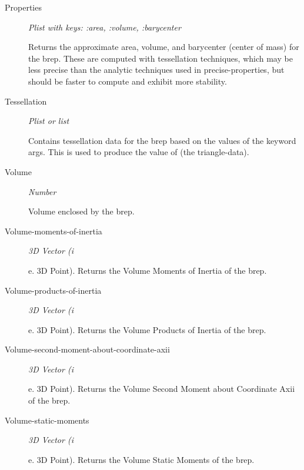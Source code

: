 \documentclass [11pt]{book}
\begin{document}
\begin{itemize}
\begin{description}
\item [Properties]
\emph{Plist with keys: :area, :volume, :barycenter}

 Returns the approximate area, volume,
and barycenter (center of mass) for the brep. These are computed with tessellation techniques,
which may be less precise than the analytic techniques used in precise-properties, but should
be faster to compute and exhibit more stability.





\item [Tessellation]
\emph{Plist or list}

 Contains tessellation data for the brep
based on the values of the keyword args. This is used to produce
the value of (the triangle-data).




\item [Volume]
\emph{Number}

 Volume enclosed by the brep.




\item [Volume-moments-of-inertia]
\emph{3D Vector (i}

e. 3D Point). Returns the Volume Moments of Inertia of the brep.




\item [Volume-products-of-inertia]
\emph{3D Vector (i}

e. 3D Point). Returns the Volume Products of Inertia of the brep.




\item [Volume-second-moment-about-coordinate-axii]
\emph{3D Vector (i}

e. 3D Point). Returns the Volume Second Moment about Coordinate Axii of the brep.




\item [Volume-static-moments]
\emph{3D Vector (i}

e. 3D Point). Returns the Volume Static Moments of the brep.




\end{description}








\end{itemize}
\end{document}
